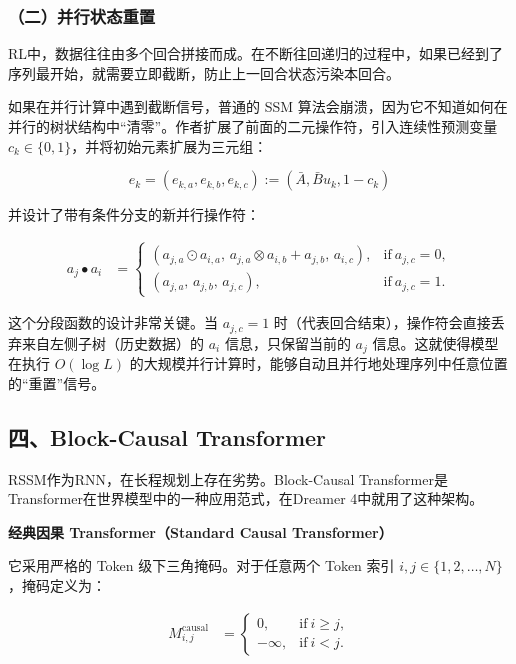 \hypertarget{ux4e8cux5e76ux884cux72b6ux6001ux91cdux7f6e}{%
\subsubsection{（二）并行状态重置}\label{ux4e8cux5e76ux884cux72b6ux6001ux91cdux7f6e}}

RL中，数据往往由多个回合拼接而成。在不断往回递归的过程中，如果已经到了序列最开始，就需要立即截断，防止上一回合状态污染本回合。

如果在并行计算中遇到截断信号，普通的 SSM 算法会崩溃，因为它不知道如何在并行的树状结构中``清零''。作者扩展了前面的二元操作符，引入连续性预测变量 \(c_k \in \{0, 1\}\)，并将初始元素扩展为三元组：

\[
e_k = (e_{k,a}, e_{k,b}, e_{k,c}) := (\bar{A}, \bar{B}u_k, 1 - c_k)
\]

并设计了带有条件分支的新并行操作符：

\[
\begin{aligned}
a_j \bullet a_i
&=
\begin{cases}
(a_{j,a} \odot a_{i,a},\, a_{j,a} \otimes a_{i,b} + a_{j,b},\, a_{i,c}), & \mathrm{if}\ a_{j,c} = 0, \\
(a_{j,a},\, a_{j,b},\, a_{j,c}), & \mathrm{if}\ a_{j,c} = 1.
\end{cases}
\end{aligned}
\]

这个分段函数的设计非常关键。当 \(a_{j,c} = 1\) 时（代表回合结束），操作符会直接丢弃来自左侧子树（历史数据）的 \(a_i\) 信息，只保留当前的 \(a_j\) 信息。这就使得模型在执行 \(O(\log L)\) 的大规模并行计算时，能够自动且并行地处理序列中任意位置的``重置''信号。

\hypertarget{ux56dbblock-causal-transformer}{%
\subsection{四、Block-Causal Transformer}\label{ux56dbblock-causal-transformer}}

RSSM作为RNN，在长程规划上存在劣势。Block-Causal Transformer是Transformer在世界模型中的一种应用范式，在Dreamer 4中就用了这种架构。

\textbf{经典因果 Transformer（Standard Causal Transformer）}

它采用严格的 Token 级下三角掩码。对于任意两个 Token 索引 \(i, j \in \{1, 2, \ldots, N\}\)，掩码定义为：

\[
\begin{aligned}
M^{\mathrm{causal}}_{i,j}
&=
\begin{cases}
0, & \mathrm{if}\ i \ge j, \\
-\infty, & \mathrm{if}\ i < j.
\end{cases}
\end{aligned}
\]

